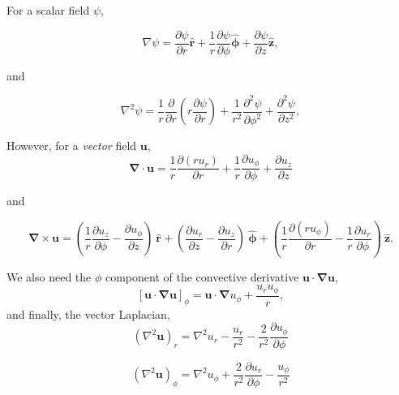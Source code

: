\documentclass{paper}
\newcommand{\uphi}{\ensuremath{u_\phi}}
\newcommand{\rhat}{\ensuremath{\mathbf{\hat{r}}}}
\newcommand{\phihat}{\ensuremath{\mathbf{\hat{\phi}}}}
\newcommand{\zhat}{\ensuremath{\mathbf{\hat{z}}}}
\begin{document}
For a scalar field $\psi$, 

\begin{equation}
  \label{eq:del_scalar}
  \nabla \psi = \frac{\partial \psi}{\partial r} \rhat + \frac{1}{r} \frac{\partial \psi}{\partial \phi} \phihat + \frac{\partial \psi}{\partial z} \zhat,
\end{equation}

and

\begin{equation}
  \label{eq:del2_scalar}
  \nabla^2 \psi = \frac{1}{r} \frac{\partial}{\partial r}\left(r \frac{\partial \psi}{\partial r} \right) + \frac{1}{r^2} \frac{\partial^2 \psi}{\partial \phi^2} + \frac{\partial^2 \psi}{\partial z^2},
\end{equation}

However, for a \emph{vector} field $\mathbf{u}$,
\begin{equation}
  \label{eq:div}
  \mathbf{\nabla \cdot u} = \frac{1}{r} \frac{\partial (r u_r)}{\partial r} + \frac{1}{r} \frac{\partial \uphi}{\partial \phi}  + \frac{\partial u_z}{\partial z}
\end{equation}

and 

\begin{equation}
  \label{eq:curl}
  \mathbf{\nabla \times u} = \left( \frac{1}{r} \frac{\partial u_z}{\partial \phi} - \frac{\partial u_\phi}{\partial z}\right)\ \rhat + \left(\frac{\partial u_r}{\partial z} - \frac{\partial u_z}{\partial r}\right)\ \phihat  + \left( \frac{1}{r} \frac{\partial (r \uphi)}{\partial r} - \frac{1}{r}\frac{\partial u_r}{\partial \phi}\right)\ \zhat.
\end{equation}

We also need the $\phi$ component of the convective derivative $\mathbf{u \cdot \nabla u}$,
\begin{equation}
  \label{eq:convective_deriv_phi}
  \left[\mathbf{u \cdot \nabla u} \right]_\phi = \mathbf{u \cdot \nabla} \uphi + \frac{ u_r \uphi}{r},
\end{equation}
and finally, the vector Laplacian,
\begin{equation}
  \label{eq:vec_lap_r}
  (\nabla^2 \mathbf{u})_r = \nabla^2 u_r - \frac{u_r}{r^2} - \frac{2}{r^2} \frac{\partial \uphi}{\partial \phi}
\end{equation}

\begin{equation}
  \label{eq:vec_lap_phi}
  (\nabla^2 \mathbf{u})_\phi = \nabla^2 u_\phi + \frac{2}{r^2} \frac{\partial u_r}{\partial \phi} - \frac{u_\phi}{r^2} 
\end{equation}
\end{document}
